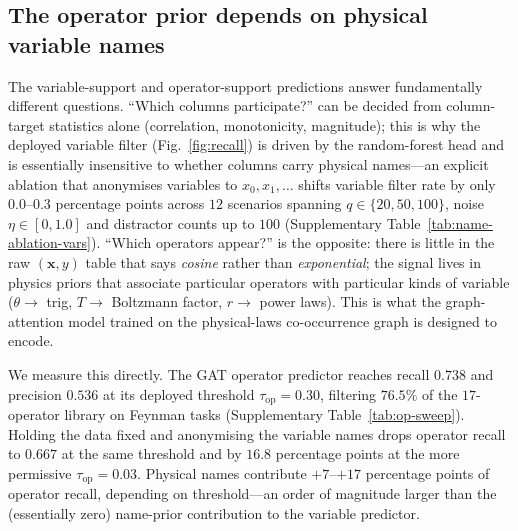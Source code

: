 \documentclass[11pt]{article}
\begin{document}
\subsection*{The operator prior depends on physical variable names}
The variable-support and operator-support predictions answer fundamentally
different questions. ``Which columns participate?'' can be decided from
column-target statistics alone (correlation, monotonicity, magnitude); this is
why the deployed variable filter (Fig.~\ref{fig:recall}) is driven by the
random-forest head and is essentially insensitive to whether columns carry
physical names---an explicit ablation that anonymises variables to
$x_0,x_1,\dots$ shifts variable filter rate by only $0.0$--$0.3$ percentage
points across $12$ scenarios spanning $q\in\{20,50,100\}$, noise
$\eta\in[0,1.0]$ and distractor counts up to $100$ (Supplementary
Table~\ref{tab:name-ablation-vars}). ``Which operators appear?'' is the
opposite: there is little in the raw $(\mathbf{x},y)$ table that says
\emph{cosine} rather than \emph{exponential}; the signal lives in physics
priors that associate particular operators with particular kinds of variable
($\theta\!\to\!$ trig, $T\!\to\!$ Boltzmann factor, $r\!\to\!$ power laws).
This is what the graph-attention model trained on the physical-laws
co-occurrence graph is designed to encode.

We measure this directly. The GAT operator predictor reaches recall $0.738$
and precision $0.536$ at its deployed threshold $\tau_{\mathrm{op}}=0.30$,
filtering $76.5\%$ of the $17$-operator library on Feynman tasks
(Supplementary Table~\ref{tab:op-sweep}). Holding the data fixed and
anonymising the variable names drops operator recall to $0.667$ at the same
threshold and by $16.8$ percentage points at the more permissive
$\tau_{\mathrm{op}}=0.03$. Physical names contribute $+7$--$+17$ percentage
points of operator recall, depending on threshold---an order of magnitude
larger than the (essentially zero) name-prior contribution to the variable
predictor.
\end{document}
